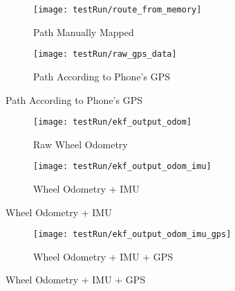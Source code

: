 \begin{figure}[p] 
	\caption{
		The rover's path.
	}
	\label{fig:roverPath}
	\begin{subfigure}{\textwidth}
		\centering
		\texttt{[image: testRun/route\_from\_memory]}
		\caption{Path Manually Mapped}
		\label{figRouteMemory}
	\end{subfigure}
	\begin{subfigure}{\textwidth}
		\centering
		\texttt{[image: testRun/raw\_gps\_data]}
		\caption{Path According to Phone's GPS}
		\label{figRouteGPS}
	\end{subfigure}
	
\end{figure}

\begin{figure}[p] 
	\caption{
		Filter Outputs For Different Sensor Fusions
	}
	\label{fig:ekfOutputs}
	\begin{subfigure}{\textwidth}
		\centering
		\texttt{[image: testRun/ekf\_output\_odom]}
		\caption{Raw Wheel Odometry}
		\label{figRouteOdom}
	\end{subfigure}
	\begin{subfigure}{\textwidth}
		\centering
		\texttt{[image: testRun/ekf\_output\_odom\_imu]}
		\caption{Wheel Odometry + IMU}
		\label{figRouteOdomImu}
	\end{subfigure}
	
\end{figure}

\begin{figure}[p] \ContinuedFloat
	\begin{subfigure}{\textwidth}
		\centering
		\texttt{[image: testRun/ekf\_output\_odom\_imu\_gps]}
		\caption{Wheel Odometry + IMU + GPS}
		\label{figRouteOdomImuGps}
	\end{subfigure}
\end{figure}